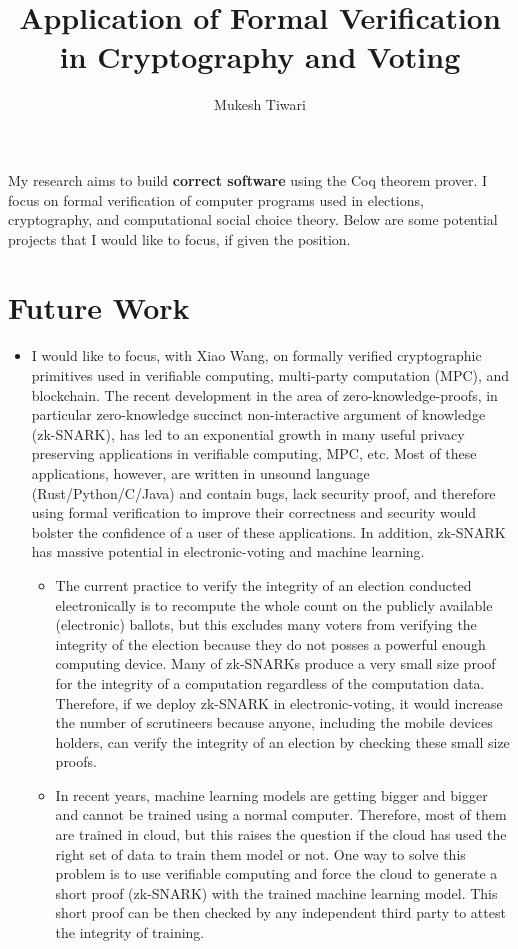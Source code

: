 \documentclass[a4paper]{article}
\title{Application of Formal Verification in Cryptography and Voting}
\author{Mukesh Tiwari}
\date{}
\begin{document}
\fontsize{11}{15}
\selectfont
\maketitle

My research aims to build \textbf{correct software} 
using the Coq theorem prover. 
I focus on formal verification of computer programs used in elections, cryptography, 
and computational social choice theory. Below are some potential projects 
that I would like to focus, if given the position.


\section{Future Work}
\begin{itemize}
    \item I would like to focus, with Xiao Wang,  
	on formally verified cryptographic primitives used in
	verifiable computing, multi-party computation (MPC), and blockchain. 
    The recent development in the area of zero-knowledge-proofs, in particular 
	zero-knowledge succinct non-interactive argument of knowledge (zk-SNARK), 
	has led to an exponential growth in many useful 
	privacy preserving applications in verifiable computing, MPC, etc. Most of these 
	applications, however, are written 
	in unsound language (Rust/Python/C/Java) and contain bugs,
	lack security proof, and therefore using formal verification 
	to improve their correctness and security would bolster the 
	confidence of a user of these applications.
	In addition, zk-SNARK has massive potential in electronic-voting and machine learning. 
	\begin{itemize}
		\item The current practice to verify the integrity of an election conducted electronically is to 
		recompute the whole count on the publicly available (electronic) ballots, but 
		this excludes many voters from verifying the integrity of the election because 
		they do not posses a powerful enough computing device. Many of 
		zk-SNARKs produce a very small size proof for the integrity of a computation 
		regardless of the computation data. Therefore, if we deploy zk-SNARK in 
		electronic-voting, it would increase the number of scrutineers because anyone, including the 
		mobile devices holders, can verify the integrity of an election by checking these small size proofs. 
		\item In recent years, 
   machine learning models are getting bigger and bigger and cannot be trained using a normal computer. 
   Therefore, most of them are trained in cloud, but this 
   raises the question if the cloud has used the right set of data to train them model or not. 
   One way to solve this problem is to use verifiable computing and force the cloud to generate 
   a short proof (zk-SNARK) with the trained machine learning model. 
   This short proof can be then checked by any independent third party to attest the 
   integrity of training. 
	\end{itemize}


\end{itemize}
\end{document}
